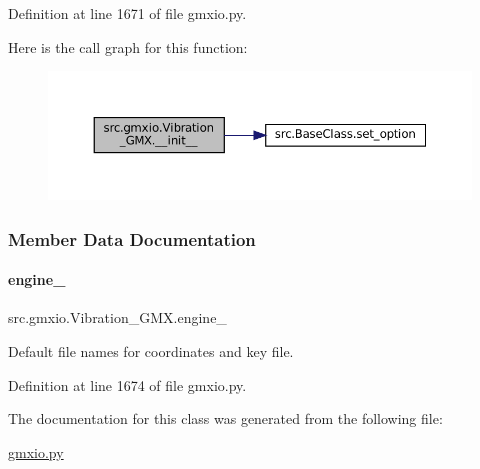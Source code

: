 Definition at line 1671 of file gmxio.\+py.

Here is the call graph for this function\+:
\nopagebreak
\begin{figure}[H]
\begin{center}
\leavevmode
\includegraphics[width=350pt]{classsrc_1_1gmxio_1_1Vibration__GMX_af2ed8380679b143d304e4b17f048f9e0_cgraph}
\end{center}
\end{figure}


\subsubsection{Member Data Documentation}
\mbox{\label{classsrc_1_1gmxio_1_1Vibration__GMX_ab657abb4629d7d53e6434855fa976f93}} 
\paragraph{\texorpdfstring{engine\+\_\+}{engine\_}}
{\footnotesize\ttfamily src.\+gmxio.\+Vibration\+\_\+\+G\+M\+X.\+engine\+\_\+}



Default file names for coordinates and key file. 



Definition at line 1674 of file gmxio.\+py.



The documentation for this class was generated from the following file\+:\begin{DoxyCompactItemize}
\item 
\hyperlink{gmxio_8py}{gmxio.\+py}\end{DoxyCompactItemize}
